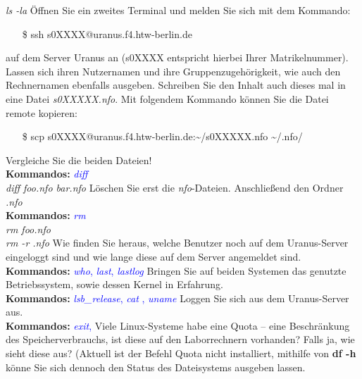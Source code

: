 \documentclass[paper=a4,fontsize=11pt]{scrartcl}%
\numberwithin{equation}{section}
\begin{document}
\begin{enumerate}
\begin{tasks}
          \textit{ls -la}  
          \task Öffnen Sie ein zweites Terminal und melden Sie sich mit dem Kommando:
          \begin{itemize}
          \item[\$]ssh s0XXXX@uranus.f4.htw-berlin.de
          \end{itemize}
           auf dem Server Uranus an (s0XXXX entspricht hierbei Ihrer Matrikelnummer).
           Lassen sich ihren Nutzernamen und ihre Gruppenzugehörigkeit, wie auch den Rechnernamen ebenfalls ausgeben. Schreiben Sie den Inhalt auch dieses mal in eine Datei \emph{s0XXXXX.nfo}. Mit folgendem Kommando können Sie die Datei remote kopieren: 
           \begin{itemize}
          \item[\$]scp s0XXXX@uranus.f4.htw-berlin.de:\textasciitilde /s0XXXXX.nfo \textasciitilde/.nfo/
          \end{itemize}
          \task Vergleiche Sie die beiden Dateien!\\
          \textbf{Kommandos:} \textcolor{blue}{\emph{diff}}\\
          \textit{diff foo.nfo bar.nfo}
          \task Löschen Sie erst die \emph{nfo}-Dateien. Anschließend den Ordner \emph{.nfo}\\
          \textbf{Kommandos:} \textcolor{blue}{\emph{rm}}\\
          \textit{rm foo.nfo}\\
          \textit{rm -r .nfo}
          \task Wie finden Sie heraus, welche Benutzer noch auf dem Uranus-Server eingeloggt sind und wie lange diese auf dem Server angemeldet sind.\\
          \textbf{Kommandos:} \textcolor{blue}{\emph{who}, \emph{last}, \emph{lastlog}}
          \task Bringen Sie auf beiden Systemen das genutzte Betriebssystem, sowie dessen Kernel in Erfahrung.\\
          \textbf{Kommandos:} \textcolor{blue}{\emph{lsb\_release}, \emph{cat }, \emph{uname}}
          \task Loggen Sie sich aus dem Uranus-Server aus.\\
          \textbf{Kommandos:} \textcolor{blue}{\emph{exit}, }
          \task Viele Linux-Systeme habe eine Quota -- eine Beschränkung des Speicherverbrauchs, ist diese auf den Laborrechnern vorhanden? Falls ja, wie sieht diese aus? (Aktuell ist der Befehl Quota nicht installiert, mithilfe von \textbf{df -h} könne Sie sich dennoch den Status des Dateisystems ausgeben lassen.
        \end{tasks}
\end{enumerate}
\end{document}
